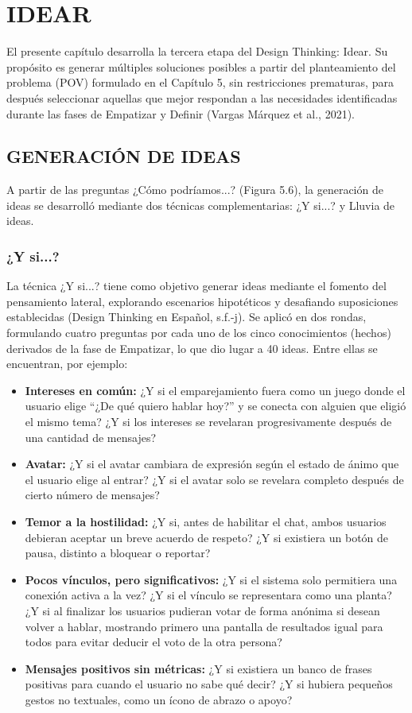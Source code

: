\chapter{IDEAR}
El presente capítulo desarrolla la tercera etapa del Design Thinking: Idear. Su propósito es generar múltiples soluciones posibles a partir del planteamiento del problema (POV) formulado en el Capítulo 5, sin restricciones prematuras, para después seleccionar aquellas que mejor respondan a las necesidades identificadas durante las fases de Empatizar y Definir (Vargas Márquez et al., 2021).

\section{GENERACIÓN DE IDEAS}
A partir de las preguntas ¿Cómo podríamos...? (Figura 5.6), la generación de ideas se desarrolló mediante dos técnicas complementarias: ¿Y si...? y Lluvia de ideas.

\subsection{¿Y si...?}
La técnica ¿Y si...? tiene como objetivo generar ideas mediante el fomento del pensamiento lateral, explorando escenarios hipotéticos y desafiando suposiciones establecidas (Design Thinking en Español, s.f.-j). Se aplicó en dos rondas, formulando cuatro preguntas por cada uno de los cinco conocimientos (hechos) derivados de la fase de Empatizar, lo que dio lugar a 40 ideas. Entre ellas se encuentran, por ejemplo:

\begin{itemize}
    \item \textbf{Intereses en común:} ¿Y si el emparejamiento fuera como un juego donde el usuario elige ``¿De qué quiero hablar hoy?'' y se conecta con alguien que eligió el mismo tema? ¿Y si los intereses se revelaran progresivamente después de una cantidad de mensajes?
    \item \textbf{Avatar:} ¿Y si el avatar cambiara de expresión según el estado de ánimo que el usuario elige al entrar? ¿Y si el avatar solo se revelara completo después de cierto número de mensajes?
    \item \textbf{Temor a la hostilidad:} ¿Y si, antes de habilitar el chat, ambos usuarios debieran aceptar un breve acuerdo de respeto? ¿Y si existiera un botón de pausa, distinto a bloquear o reportar?
    \item \textbf{Pocos vínculos, pero significativos:} ¿Y si el sistema solo permitiera una conexión activa a la vez? ¿Y si el vínculo se representara como una planta? ¿Y si al finalizar los usuarios pudieran votar de forma anónima si desean volver a hablar, mostrando primero una pantalla de resultados igual para todos para evitar deducir el voto de la otra persona?
    \item \textbf{Mensajes positivos sin métricas:} ¿Y si existiera un banco de frases positivas para cuando el usuario no sabe qué decir? ¿Y si hubiera pequeños gestos no textuales, como un ícono de abrazo o apoyo?
\end{itemize}

